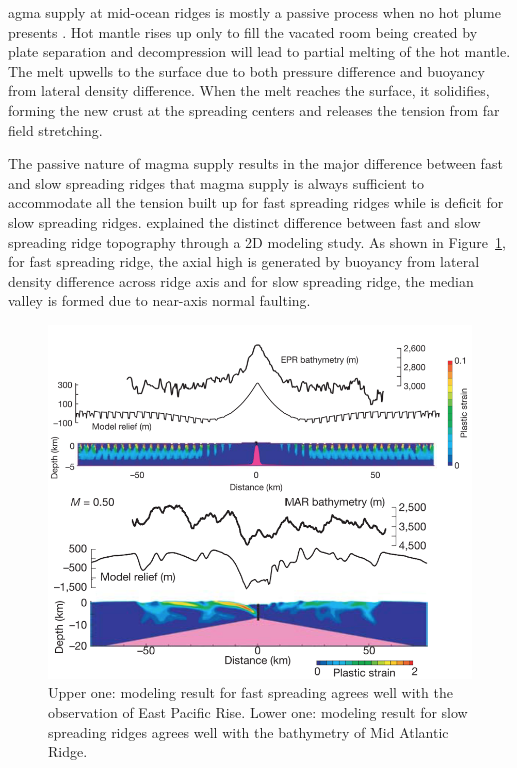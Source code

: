 \documentclass[12pt]{article}
\begin{document}
agma supply at mid-ocean ridges is mostly a passive process when no hot plume presents \citep{Fowler2004}. Hot mantle rises up only to fill the vacated room being created by plate separation and decompression will lead to partial melting of the hot mantle. The melt upwells to the surface due to both pressure difference and buoyancy from lateral density difference. When the melt reaches the surface, it solidifies, forming the new crust at the spreading centers and releases the tension from far field stretching. 

The passive nature of magma supply results in the major difference between fast and slow spreading ridges that magma supply is always sufficient to accommodate all the tension built up for fast spreading ridges while is deficit for slow spreading ridges. \citep{Buck2005} explained the distinct difference between fast and slow spreading ridge topography through a 2D modeling study. As shown in Figure~\ref{fig5_1}, for fast spreading ridge, the axial high is generated by buoyancy from lateral density difference across ridge axis and for slow spreading ridge, the median valley is formed due to near-axis normal faulting.   
\begin{figure}[H]
 \centering
  \includegraphics[scale=0.7]{fig5_1.png}
 \caption{\small{Upper one: modeling result for fast spreading agrees well with the observation of East Pacific Rise. Lower one: modeling result for slow spreading ridges agrees well with the bathymetry of Mid Atlantic Ridge. \citep{Buck2005}}}
 \label{fig5_1}
\end{figure}
\end{document}
